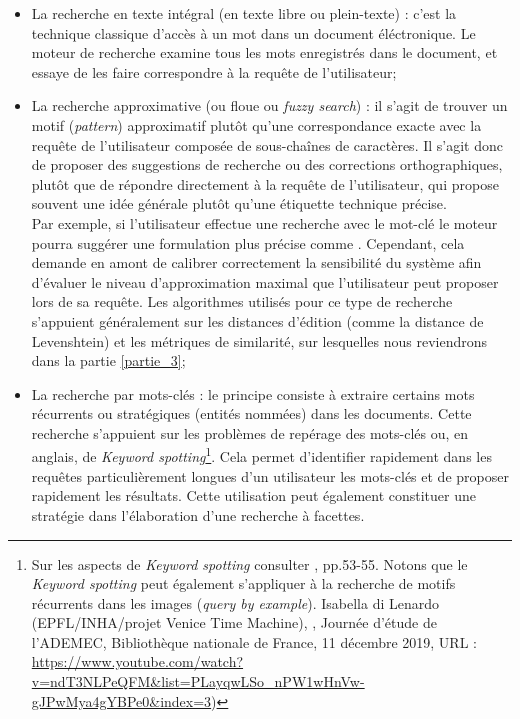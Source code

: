 \begin{itemize}
    \item La recherche en texte intégral (en texte libre ou plein-texte) : c'est la technique classique d'accès à un mot dans un document éléctronique. Le moteur de recherche examine tous les mots enregistrés dans le document, et essaye de les faire correspondre à la requête de l'utilisateur;\\
    \item La recherche approximative (ou floue ou \textit{fuzzy search}) : il s'agit de trouver un motif (\textit{pattern}) approximatif plutôt qu'une correspondance exacte avec la requête de l'utilisateur composée de sous-chaînes de caractères. Il s'agit donc de proposer des suggestions de recherche ou des corrections orthographiques, plutôt que de répondre directement à la requête de l'utilisateur, qui propose souvent une idée générale plutôt qu'une étiquette technique précise.\\Par exemple, si l'utilisateur effectue une recherche avec le mot-clé  le moteur pourra suggérer une formulation plus précise comme . Cependant, cela demande en amont de calibrer correctement la sensibilité du système afin d'évaluer le niveau d'approximation maximal que l'utilisateur peut proposer lors de sa requête.
    Les algorithmes utilisés pour ce type de recherche s'appuient généralement sur les distances d'édition (comme la distance de Levenshtein) et les métriques de similarité, sur lesquelles nous reviendrons dans la partie \ref{partie_3};\\
    \item La recherche par mots-clés : le principe consiste à extraire certains mots récurrents ou stratégiques (entités nommées) dans les documents. Cette recherche s'appuient sur les problèmes de repérage des mots-clés ou, en anglais, de \textit{Keyword spotting}\footnote{Sur les aspects de \textit{Keyword spotting} consulter \cite{bonhomme_defis_2018}, pp.53-55. Notons que le \textit{Keyword spotting} peut également s'appliquer à la recherche de motifs récurrents dans les images (\textit{query by example}). Isabella di Lenardo (EPFL/INHA/projet Venice Time Machine), , Journée d'étude  de l'ADEMEC, Bibliothèque nationale de France, 11 décembre 2019, URL : \url{https://www.youtube.com/watch?v=ndT3NLPeQFM&list=PLayqwLSo_nPW1wHnVw-gJPwMya4gYBPe0&index=3})}. Cela permet d'identifier rapidement dans les requêtes particulièrement longues d'un utilisateur les mots-clés et de proposer rapidement les résultats. Cette utilisation peut également constituer une stratégie dans l'élaboration d'une recherche à facettes. 
\end{itemize}
